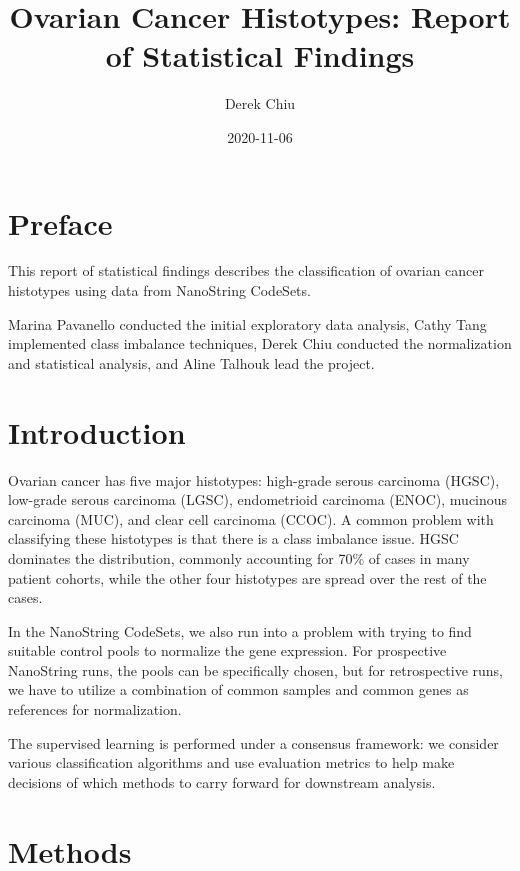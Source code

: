 \documentclass[
]{report}
\title{Ovarian Cancer Histotypes: Report of Statistical Findings}
\author{Derek Chiu}
\date{2020-11-06}
\begin{document}
\maketitle

{
\hypersetup{linkcolor=}
\setcounter{tocdepth}{1}
\tableofcontents
}
\listoftables
\listoffigures
\hypertarget{preface}{%
\chapter*{Preface}\label{preface}}

This report of statistical findings describes the classification of ovarian cancer histotypes using data from NanoString CodeSets.

Marina Pavanello conducted the initial exploratory data analysis, Cathy Tang implemented class imbalance techniques, Derek Chiu conducted the normalization and statistical analysis, and Aline Talhouk lead the project.

\hypertarget{introduction}{%
\chapter{Introduction}\label{introduction}}

Ovarian cancer has five major histotypes: high-grade serous carcinoma (HGSC), low-grade serous carcinoma (LGSC), endometrioid carcinoma (ENOC), mucinous carcinoma (MUC), and clear cell carcinoma (CCOC). A common problem with classifying these histotypes is that there is a class imbalance issue. HGSC dominates the distribution, commonly accounting for 70\% of cases in many patient cohorts, while the other four histotypes are spread over the rest of the cases.

In the NanoString CodeSets, we also run into a problem with trying to find suitable control pools to normalize the gene expression. For prospective NanoString runs, the pools can be specifically chosen, but for retrospective runs, we have to utilize a combination of common samples and common genes as references for normalization.

The supervised learning is performed under a consensus framework: we consider various classification algorithms and use evaluation metrics to help make decisions of which methods to carry forward for downstream analysis.

\hypertarget{methods}{%
\chapter{Methods}\label{methods}}
\end{document}
